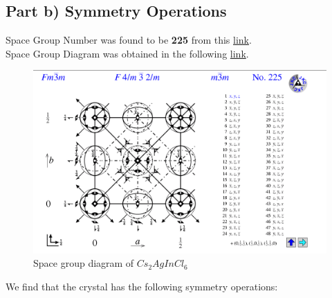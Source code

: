 \documentclass{homework}
\begin{document}
\subsection*{Part b) Symmetry Operations}
Space Group Number was found to be \textbf{225} from this  \href{http://img.chem.ucl.ac.uk/sgp/large/sgp.htm}{link}.
\\
Space Group Diagram was obtained in the following \href{http://img.chem.ucl.ac.uk/sgp/large/225az1.htm}{link}.
\begin{figure}[!h]
\centering
\includegraphics[width=1\textwidth]{space_group_diagram.png}
\caption{Space group diagram of $Cs_{2}AgInCl_{6}$}
\end{figure}
\FloatBarrier
We find that the crystal has the following symmetry operations:
\end{document}
